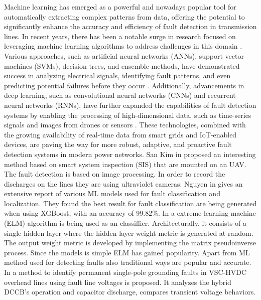 \documentclass[11pt]{IEEEtran}
\begin{document}
Machine learning has emerged as a powerful and nowadays popular tool for automatically extracting complex patterns from data, offering the potential to significantly enhance the accuracy and efficiency of fault detection in transmission lines. In recent years, there has been a notable surge in research focused on leveraging machine learning algorithms to address challenges in this domain \cite{HUANG2006489}. Various approaches, such as artificial neural networks (ANNs), support vector machines (SVMs), decision trees, and ensemble methods, have demonstrated success in analyzing electrical signals, identifying fault patterns, and even predicting potential failures before they occur \cite{HUANG2006489}\cite{HUANG2006489}. Additionally, advancements in deep learning, such as convolutional neural networks (CNNs) and recurrent neural networks (RNNs), have further expanded the capabilities of fault detection systems by enabling the processing of high-dimensional data, such as time-series signals and images from drones or sensors \cite{HUANG2006489}. These technologies, combined with the growing availability of real-time data from smart grids and IoT-enabled devices, are paving the way for more robust, adaptive, and proactive fault detection systems in modern power networks. San Kim in  \cite{HUANG2006489} proposed an interesting method based on smart system inspection (SIS) that are mounted on an UAV. The fault detection is based on image processing. In order to record the discharges on the lines they are using ultraviolet cameras. Nguyen in \cite{HUANG2006489} gives an extensive report of various ML models used for fault classification and localization. They found the best result for fault classification are being generated when using XGBoost, with an accuracy of 99.82\%. In \cite{HUANG2006489} a extreme learning machine (ELM) algorithm \cite{HUANG2006489} is being used as an classiffier. Architecturally, it consists of a single hidden layer where the hidden layer weight metric is generated at random. The output weight metric is developed by implementing the matrix pseudoinverse process. Since the models is simple ELM has gained popularity. Apart from ML method used for detecting faults also traditional ways are popular and accurate. In \cite{HUANG2006489} a method to identify permanent single-pole grounding faults in VSC-HVDC overhead lines using fault line voltages is proposed. It analyzes the hybrid DCCB's operation and capacitor discharge, compares transient voltage behaviors. \\ 
\end{document}
